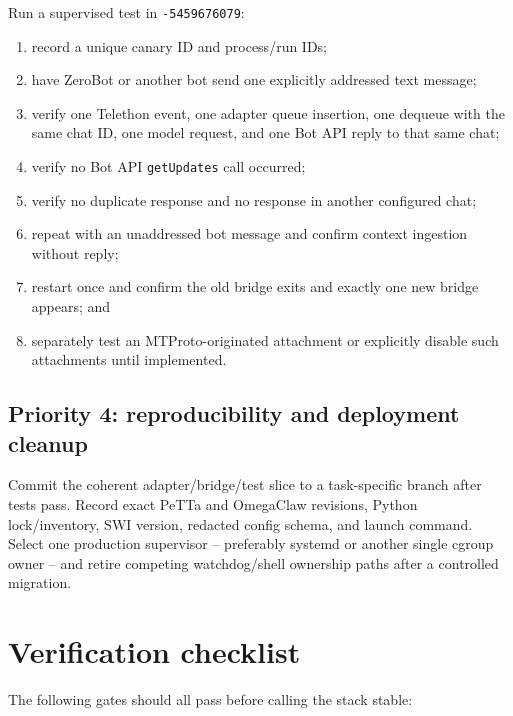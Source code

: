 \documentclass[10pt]{article}
\newcommand{\code}[1]{\texttt{#1}}
\begin{document}
Run a supervised test in \code{-5459676079}:
\begin{enumerate}
  \item record a unique canary ID and process/run IDs;
  \item have ZeroBot or another bot send one explicitly addressed text message;
  \item verify one Telethon event, one adapter queue insertion, one dequeue with the same chat ID, one model request, and one Bot API reply to that same chat;
  \item verify no Bot API \code{getUpdates} call occurred;
  \item verify no duplicate response and no response in another configured chat;
  \item repeat with an unaddressed bot message and confirm context ingestion without reply;
  \item restart once and confirm the old bridge exits and exactly one new bridge appears; and
  \item separately test an MTProto-originated attachment or explicitly disable such attachments until implemented.
\end{enumerate}

\subsection{Priority 4: reproducibility and deployment cleanup}

Commit the coherent adapter/bridge/test slice to a task-specific branch after tests pass. Record exact PeTTa and OmegaClaw revisions, Python lock/inventory, SWI version, redacted config schema, and launch command. Select one production supervisor -- preferably systemd or another single cgroup owner -- and retire competing watchdog/shell ownership paths after a controlled migration.

\section{Verification checklist}

The following gates should all pass before calling the stack stable:
\end{document}
